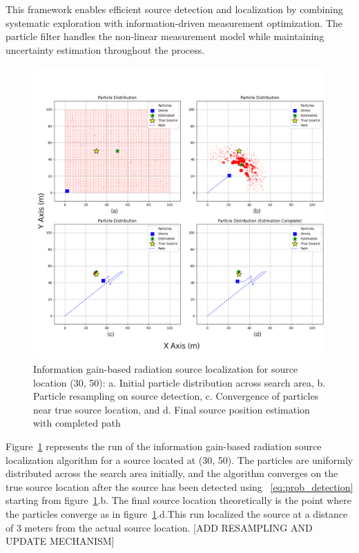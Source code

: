 \documentclass[../report.tex]{subfiles}
\begin{document}
    This framework enables efficient source detection and localization by combining systematic exploration with information-driven measurement optimization. The particle filter handles the non-linear measurement model while maintaining uncertainty estimation throughout the process.

    \begin{figure}[ht]
        \centering
        \includegraphics[width=\linewidth]{figures/entropy_algorithm_with_label.png}
        \caption{Information gain-based radiation source localization for source location (30, 50): a. Initial particle distribution across search area, 
        b. Particle resampling on source detection, 
        c. Convergence of particles near true source location, and 
        d. Final source position estimation with completed path}
        \label{fig:entropy_algorithm_with_plot}
    \end{figure}

    Figure~\ref{fig:entropy_algorithm_with_plot} represents the run of the information gain-based radiation source localization algorithm for a source located at (30, 50). The 
    particles are uniformly distributed across the search area initially, and the algorithm converges on the true source location after the source has been detected using ~\ref{eq:prob_detection} starting 
    from figure~\ref{fig:entropy_algorithm_with_plot}.b. The final source location theoretically is the point where the  particles converge as in figure~\ref{fig:entropy_algorithm_with_plot}.d.This 
    run localized the source at a distance of 3 meters from the actual source location.
    [ADD RESAMPLING AND UPDATE MECHANISM]
\end{document}
